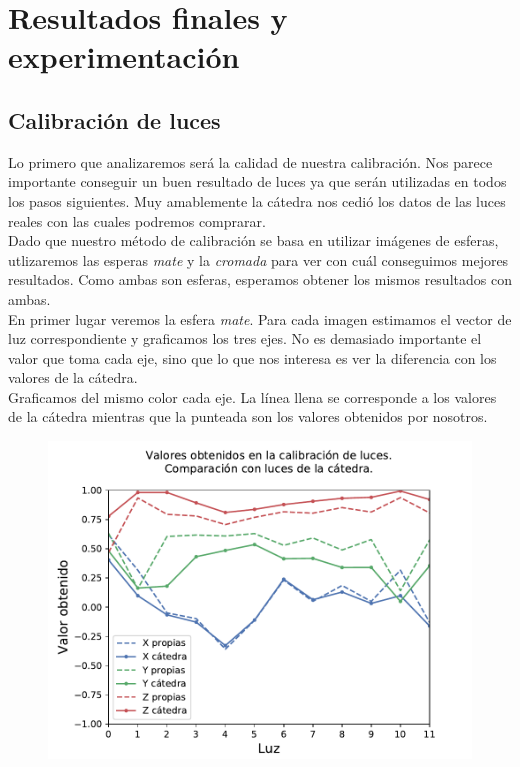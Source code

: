 \section{Resultados finales y experimentación}


\subsection{Calibración de luces}

Lo primero que analizaremos será la calidad de nuestra calibración. Nos parece importante conseguir un buen resultado de luces ya que serán utilizadas en todos los pasos siguientes. Muy amablemente la cátedra nos cedió los datos de las luces reales con las cuales podremos comprarar. \\

Dado que nuestro método de calibración se basa en utilizar imágenes de esferas, utlizaremos las esperas \textit{mate} y la \textit{cromada} para ver con cuál conseguimos mejores resultados. Como ambas son esferas, esperamos obtener los mismos resultados con ambas. \\

En primer lugar veremos la esfera \textit{mate}. Para cada imagen estimamos el vector de luz correspondiente y graficamos los tres ejes. No es demasiado importante el valor que toma cada eje, sino que lo que nos interesa es ver la diferencia con los valores de la cátedra. \\

Graficamos del mismo color cada eje. La línea llena se corresponde a los valores de la cátedra mientras que la punteada son los valores obtenidos por nosotros. \\

{\centering
\begin{figure}[H]
\centering
    \includegraphics[scale=0.80]{informe/imagenes/lucesComparacionFinalMate.pdf}
    \end{figure}
}

